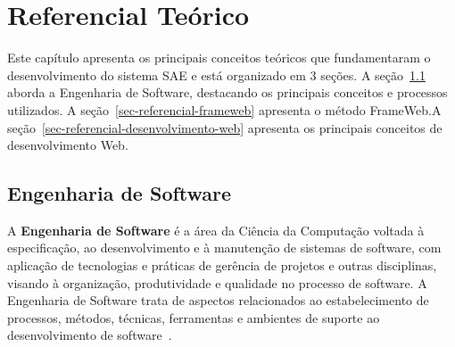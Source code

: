 % 
\chapter{Referencial Teórico}
\label{sec-referencial}

Este capítulo apresenta os principais conceitos teóricos que fundamentaram o desenvolvimento do sistema SAE e está organizado em 3 seções. A seção~\ref{sec-referencial-engenharia-software} aborda a Engenharia de Software, destacando os principais conceitos e processos utilizados. A seção~\ref{sec-referencial-frameweb} apresenta o método FrameWeb.A seção~\ref{sec-referencial-desenvolvimento-web} apresenta os principais conceitos de desenvolvimento Web.





\section{Engenharia de Software}
\label{sec-referencial-engenharia-software}

A \textbf{Engenharia de Software} é a área da Ciência da Computação voltada à especificação, ao desenvolvimento e à manutenção de sistemas de software, com aplicação de tecnologias e práticas de gerência de projetos e outras disciplinas, visando à organização, produtividade e qualidade no processo de software. A Engenharia de Software trata de aspectos relacionados ao estabelecimento de processos, métodos, técnicas, ferramentas e ambientes de suporte ao desenvolvimento de software~\cite{falboEngSoft}.

